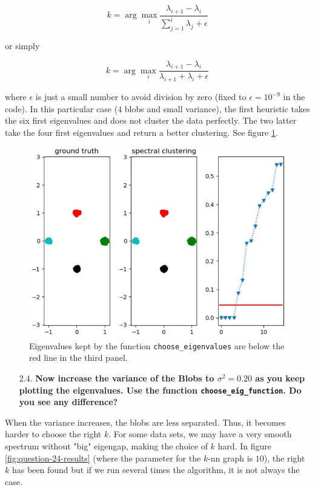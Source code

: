 \documentclass[a4paper, 11pt]{article}
\begin{document}
    \[ k = \arg \max_{i} \frac{\lambda_{i+1} - \lambda_{i}}{\sum_{j=1}^{i} \lambda_{j} + \epsilon} \]

    or simply

    \[ k = \arg \max_{i} \frac{\lambda_{i+1} - \lambda_{i}}{\lambda_{i+1} + \lambda_{i} + \epsilon} \]

    where $\epsilon$ is just a small number to avoid division by zero (fixed to $\epsilon = 10^{-9}$ in the code). In this particular case ($4$ blobs and small variance), the first heuristic takes the six first eigenvalues and does not cluster the data perfectly. The two latter take the four first eigenvalues and return a better clustering. See figure \ref{fig:find-the-bend}.

    \begin{figure}[!ht]
        \centering
        \includegraphics[width=.5\textwidth]{images/find_the_bend.jpg}
        \caption{Eigenvalues kept by the function \texttt{choose\_eigenvalues} are below the red line in the third panel.}
        \label{fig:find-the-bend}
    \end{figure}

    \pagebreak

\begin{itemize}
    \item[2.4.] \textbf{Now increase the variance of the Blobs to $\sigma^{2} = 0.20$ as you keep plotting the eigenvalues. Use the function \texttt{choose\_eig\_function}. Do you see any difference?}
\end{itemize}

    When the variance increases, the blobs are less separated. Thus, it becomes harder to choose the right $k$. For some data sets, we may have a very smooth spectrum without "big" eigengap, making the choice of $k$ hard. In figure \ref{fig:question-24-results} (where the parameter for the $k$-nn graph is $10$), the right $k$ has been found but if we run several times the algorithm, it is not always the case.
\end{document}
